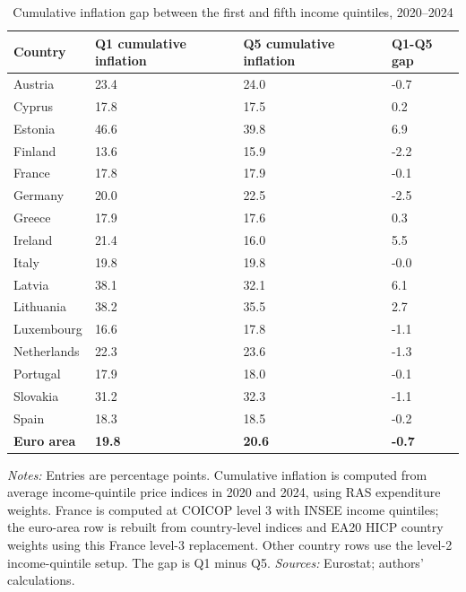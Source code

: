 \begin{table}[H]
\small
\setlength{\tabcolsep}{5pt}
\renewcommand{\arraystretch}{0.95}

\caption{\label{tab:country-heterogeneity-cumulative-gap}Cumulative inflation gap between the first and fifth income quintiles, 2020--2024}
\centering
\begin{tabular}[t]{llll}
\toprule
Country & Q1 cumulative inflation & Q5 cumulative inflation & Q1-Q5 gap\\
\midrule
Austria & 23.4 & 24.0 & -0.7\\
Cyprus & 17.8 & 17.5 & 0.2\\
Estonia & 46.6 & 39.8 & 6.9\\
Finland & 13.6 & 15.9 & -2.2\\
France & 17.8 & 17.9 & -0.1\\
\addlinespace
Germany & 20.0 & 22.5 & -2.5\\
Greece & 17.9 & 17.6 & 0.3\\
Ireland & 21.4 & 16.0 & 5.5\\
Italy & 19.8 & 19.8 & -0.0\\
Latvia & 38.1 & 32.1 & 6.1\\
\addlinespace
Lithuania & 38.2 & 35.5 & 2.7\\
Luxembourg & 16.6 & 17.8 & -1.1\\
Netherlands & 22.3 & 23.6 & -1.3\\
Portugal & 17.9 & 18.0 & -0.1\\
Slovakia & 31.2 & 32.3 & -1.1\\
\addlinespace
Spain & 18.3 & 18.5 & -0.2\\
\midrule
\textbf{Euro area} & \textbf{19.8} & \textbf{20.6} & \textbf{-0.7}\\
\bottomrule
\end{tabular}
\vspace{-0.4em}
\begin{flushleft}
\footnotesize{\emph{Notes:} Entries are percentage points. Cumulative inflation is computed from average income-quintile price indices in 2020 and 2024, using RAS expenditure weights. France is computed at COICOP level 3 with INSEE income quintiles; the euro-area row is rebuilt from country-level indices and EA20 HICP country weights using this France level-3 replacement. Other country rows use the level-2 income-quintile setup. The gap is Q1 minus Q5. \emph{Sources:} Eurostat; authors' calculations.}
\end{flushleft}
\end{table}

